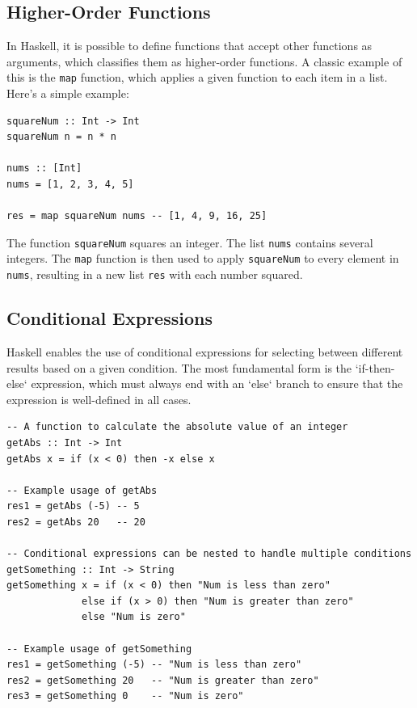 \documentclass[a4paper, 10pt]{article}
\begin{document}
     \subsection{Higher-Order Functions}
            In Haskell, it is possible to define functions that accept other functions as arguments, which classifies them as higher-order functions. A classic example of this is the \texttt{map} function, which applies a given function to each item in a list.
            Here's a simple example:

            \begin{lstlisting}
squareNum :: Int -> Int
squareNum n = n * n

nums :: [Int]
nums = [1, 2, 3, 4, 5]

res = map squareNum nums -- [1, 4, 9, 16, 25]
            \end{lstlisting}

            \noindent The function \texttt{squareNum} squares an integer. The list \texttt{nums} contains several integers. The \texttt{map} function is then used to apply \texttt{squareNum} to every element in \texttt{nums}, resulting in a new list \texttt{res} with each number squared.


        \newpage
        \subsection{Conditional Expressions}
            Haskell enables the use of conditional expressions for selecting between different results based on a given condition. The most fundamental form is the `if-then-else` expression, which must always end with an `else` branch to ensure that the expression is well-defined in all cases.

            \lstset{language=Haskell}
            \begin{lstlisting}
-- A function to calculate the absolute value of an integer
getAbs :: Int -> Int
getAbs x = if (x < 0) then -x else x

-- Example usage of getAbs
res1 = getAbs (-5) -- 5
res2 = getAbs 20   -- 20

-- Conditional expressions can be nested to handle multiple conditions
getSomething :: Int -> String
getSomething x = if (x < 0) then "Num is less than zero"
             else if (x > 0) then "Num is greater than zero"
             else "Num is zero"

-- Example usage of getSomething
res1 = getSomething (-5) -- "Num is less than zero"
res2 = getSomething 20   -- "Num is greater than zero"
res3 = getSomething 0    -- "Num is zero"
            \end{lstlisting}
\end{document}
